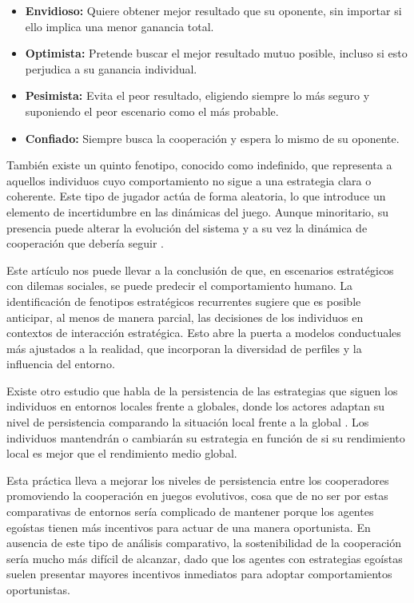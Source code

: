 \documentclass[a4paper,12pt]{report}
\begin{document}
\begin{itemize}
\item \textbf{Envidioso:} Quiere obtener mejor resultado que su oponente, sin importar si ello implica una menor ganancia total.
\item \textbf{Optimista:} Pretende buscar el mejor resultado mutuo posible, incluso si esto perjudica a su ganancia individual.
\item \textbf{Pesimista:} Evita el peor resultado, eligiendo siempre lo más seguro y suponiendo el peor escenario como el más probable.
\item \textbf{Confiado:} Siempre busca la cooperación y espera lo mismo de su oponente.
\end{itemize}

También existe un quinto fenotipo, conocido como indefinido, que representa a aquellos individuos cuyo comportamiento no sigue a una estrategia clara o coherente. Este tipo de jugador actúa de forma aleatoria, lo que introduce un elemento de incertidumbre en las dinámicas del juego. Aunque minoritario, su presencia puede alterar la evolución del sistema y a su vez la dinámica de cooperación que debería seguir \cite{paper_principal}.

Este artículo nos puede llevar a la conclusión de que, en escenarios estratégicos con dilemas sociales, se puede predecir el comportamiento humano. La identificación de fenotipos estratégicos recurrentes sugiere que es posible anticipar, al menos de manera parcial, las decisiones de los individuos en contextos de interacción estratégica. Esto abre la puerta a modelos conductuales más ajustados a la realidad, que incorporan la diversidad de perfiles y la influencia del entorno.

Existe otro estudio que habla de la persistencia de las estrategias que siguen los individuos en entornos locales frente a globales, donde los actores adaptan su nivel de persistencia comparando la situación local frente a la global \cite{liming2022adaptative}. Los individuos mantendrán o cambiarán su estrategia en función de si su rendimiento local es mejor que el rendimiento medio global.

Esta práctica lleva a mejorar los niveles de persistencia entre los cooperadores promoviendo la cooperación en juegos evolutivos, cosa que de no ser por estas comparativas de entornos sería complicado de mantener porque los agentes egoístas tienen más incentivos para actuar de una manera oportunista. En ausencia de este tipo de análisis comparativo, la sostenibilidad de la cooperación sería mucho más difícil de alcanzar, dado que los agentes con estrategias egoístas suelen presentar mayores incentivos inmediatos para adoptar comportamientos oportunistas.
\end{document}
